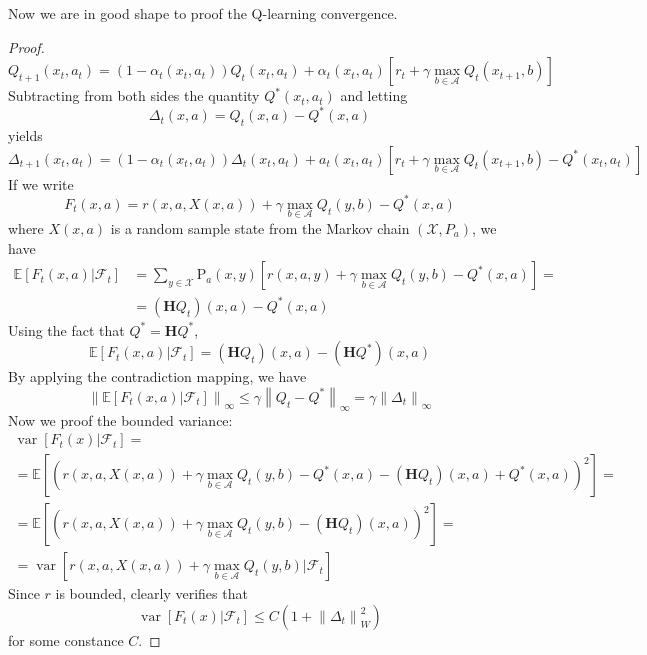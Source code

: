 \documentclass[a4paper]{article}
\theoremstyle{definition}
\begin{document}
Now we are in good shape to proof the Q-learning convergence.
\begin{proof}
$$
Q_{t+1}\left(x_{t}, a_{t}\right)=\left(1-\alpha_{t}\left(x_{t}, a_{t}\right)\right) Q_{t}\left(x_{t}, a_{t}\right)+\alpha_{t}\left(x_{t}, a_{t}\right)\left[r_{t}+\gamma \max _{b \in \mathcal{A}} Q_{t}\left(x_{t+1}, b\right)\right]
$$
Subtracting from both sides the quantity \(Q^{*}\left(x_{t}, a_{t}\right)\) and letting
$$
\Delta_{t}(x, a)=Q_{t}(x, a)-Q^{*}(x, a)
$$
yields
$$
\Delta_{t+1}(x_t, a_t) = \left(1-\alpha_{t}\left(x_{t}, a_{t}\right)\right)\Delta_{t}(x_t, a_t) + a_t(x_t, a_t)\left[r_{t}+\gamma \max _{b \in \mathcal{A}} Q_{t}\left(x_{t+1}, b\right)-Q^{*}\left(x_{t}, a_{t}\right)\right]
$$
If we write
$$
F_{t}(x, a)=r(x, a, X(x, a))+\gamma \max _{b \in \mathcal{A}} Q_{t}(y, b)-Q^{*}(x, a)
$$
where $X(x, a)$ is a random sample state from the Markov chain $(\mathcal{X}, P_a)$,
we have
\begin{align*} \mathbb{E}\left[F_{t}(x, a) | \mathcal{F}_{t}\right] &=\sum_{y \in \mathcal{X}} \mathrm{P}_{a}(x, y)\left[r(x, a, y)+\gamma \max _{b \in \mathcal{A}} Q_{t}(y, b)-Q^{*}(x, a)\right]=\\ &=\left(\mathbf{H} Q_{t}\right)(x, a)-Q^{*}(x, a) \end{align*}
Using the fact that $Q^{*} = \mathbf{H}Q^{*}$,
\begin{equation}
\mathbb{E}\left[F_{t}(x, a) | \mathcal{F}_{t}\right]=\left(\mathbf{H} Q_{t}\right)(x, a)-\left(\mathbf{H} Q^{*}\right)(x, a)
\end{equation}
By applying the contradiction mapping, we have
\begin{equation}
\left\|\mathbb{E}\left[F_{t}(x, a) | \mathcal{F}_{t}\right]\right\|_{\infty} \leq \gamma\left\|Q_{t}-Q^{*}\right\|_{\infty}=\gamma\left\|\Delta_{t}\right\|_{\infty}
\end{equation}
Now we proof the bounded variance:
\begin{equation}
\begin{array}{l}{\operatorname{var}\left[F_{t}(x) | \mathcal{F}_{t}\right]=} \\ {=\mathbb{E}\left[\left(r(x, a, X(x, a))+\gamma \max _{b \in \mathcal{A}} Q_{t}(y, b)-Q^{*}(x, a)-\left(\mathbf{H} Q_{t}\right)(x, a)+Q^{*}(x, a)\right)^{2}\right]=} \\ {=\mathbb{E}\left[\left(r(x, a, X(x, a))+\gamma \max _{b \in \mathcal{A}} Q_{t}(y, b)-\left(\mathbf{H} Q_{t}\right)(x, a)\right)^{2}\right]=} \\ {=\operatorname{var}\left[r(x, a, X(x, a))+\gamma \max _{b \in \mathcal{A}} Q_{t}(y, b) | \mathcal{F}_{t}\right]}\end{array}
\end{equation}
Since $r$ is bounded, clearly verifies that 
\begin{equation}
\operatorname{var}\left[F_{t}(x) | \mathcal{F}_{t}\right] \leq C\left(1+\left\|\Delta_{t}\right\|_{W}^{2}\right)
\end{equation}
for some constance $C$.
\end{proof}
\end{document}
